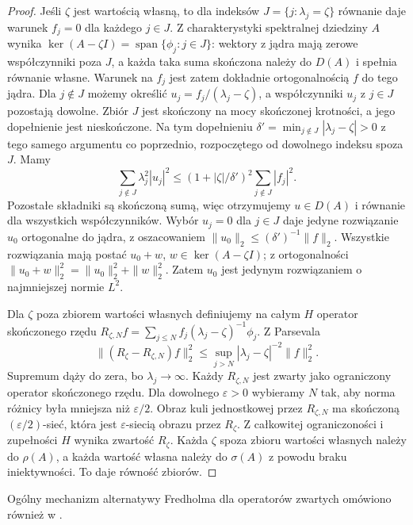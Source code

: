 \begin{proof}
Jeśli $\zeta$ jest wartością własną, to dla indeksów
$J=\{j:\lambda_j=\zeta\}$ równanie daje warunek
$f_j=0$ dla każdego $j\in J$.
Z charakterystyki spektralnej dziedziny $A$ wynika
$\ker(A-\zeta I)=\operatorname{span}\{\phi_j:j\in J\}$:
wektory z jądra mają zerowe współczynniki poza $J$,
a każda taka suma skończona należy do $D(A)$ i spełnia
równanie własne. Warunek na $f_j$ jest zatem dokładnie
ortogonalnością $f$ do tego jądra.
Dla $j\notin J$ możemy określić
$u_j=f_j/(\lambda_j-\zeta)$, a współczynniki $u_j$
z $j\in J$ pozostają dowolne. Zbiór $J$ jest skończony
na mocy skończonej krotności, a jego dopełnienie
jest nieskończone. Na tym dopełnieniu
$\delta'=\min_{j\notin J}|\lambda_j-\zeta|>0$
z tego samego argumentu co poprzednio, rozpoczętego
od dowolnego indeksu spoza $J$.
Mamy
\[
 \sum_{j\notin J}\lambda_j^2|u_j|^2
 \le(1+|\zeta|/\delta')^2\sum_{j\notin J}|f_j|^2.
\]
Pozostałe składniki są skończoną sumą, więc
otrzymujemy $u\in D(A)$ i równanie dla wszystkich
współczynników. Wybór $u_j=0$ dla $j\in J$ daje jedyne
rozwiązanie $u_0$ ortogonalne do jądra, z oszacowaniem
$\|u_0\|_2\le(\delta')^{-1}\|f\|_2$.
Wszystkie rozwiązania mają postać $u_0+w$,
$w\in\ker(A-\zeta I)$; z ortogonalności
$\|u_0+w\|_2^2=\|u_0\|_2^2+\|w\|_2^2$.
Zatem $u_0$ jest jedynym rozwiązaniem o najmniejszej
normie $L^2$.

Dla $\zeta$ poza zbiorem wartości własnych definiujemy
na całym $H$ operator skończonego rzędu
$R_{\zeta,N}f=\sum_{j\le N} f_j(\lambda_j-\zeta)^{-1}\phi_j$.
Z Parsevala
\[
 \|(R_\zeta-R_{\zeta,N})f\|_2^2
 \le \sup_{j>N}|\lambda_j-\zeta|^{-2}\|f\|_2^2.
\]
Supremum dąży do zera, bo $\lambda_j\to\infty$.
Każdy $R_{\zeta,N}$ jest zwarty jako ograniczony operator
skończonego rzędu. Dla dowolnego $\varepsilon>0$ wybieramy
$N$ tak, aby norma różnicy była mniejsza niż $\varepsilon/2$.
Obraz kuli jednostkowej przez $R_{\zeta,N}$ ma skończoną
$(\varepsilon/2)$-sieć, która jest $\varepsilon$-siecią
obrazu przez $R_\zeta$. Z całkowitej ograniczoności
i zupełności $H$ wynika zwartość $R_\zeta$.
Każda $\zeta$ spoza zbioru wartości własnych należy do
$\rho(A)$, a każda wartość własna należy do $\sigma(A)$
z powodu braku iniektywności. To daje równość zbiorów.
\end{proof}

Ogólny mechanizm alternatywy Fredholma dla operatorów
zwartych omówiono również w .

